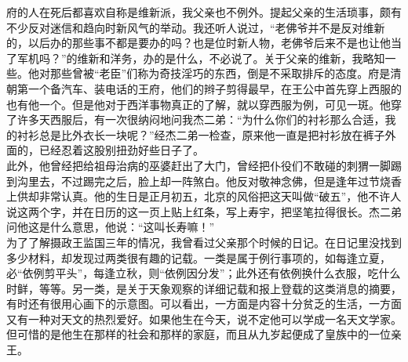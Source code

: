 府的人在死后都喜欢自称是维新派，我父亲也不例外。提起父亲的生活琐事，颇有不少反对迷信和趋向时新风气的举动。我还听人说过，“老佛爷并不是反对维新的，以后办的那些事不都是要办的吗？也是位时新人物，老佛爷后来不是也让他当了军机吗？”的维新和洋务，办的是什么，不必说了。关于父亲的维新，我略知一些。他对那些曾被“老臣”们称为奇技淫巧的东西，倒是不采取排斥的态度。府是清朝第一个备汽车、装电话的王府，他们的辫子剪得最早，在王公中首先穿上西服的也有他一个。但是他对于西洋事物真正的了解，就以穿西服为例，可见一斑。他穿了许多天西服后，有一次很纳闷地问我杰二弟：“为什么你们的衬衫那么合适，我的衬衫总是比外衣长一块呢？”经杰二弟一检查，原来他一直是把衬衫放在裤子外面的，已经忍着这股别扭劲好些日子了。\\

此外，他曾经把给祖母治病的巫婆赶出了大门，曾经把仆役们不敢碰的刺猬一脚踢到沟里去，不过踢完之后，脸上却一阵煞白。他反对敬神念佛，但是逢年过节烧香上供却非常认真。他的生日是正月初五，北京的风俗把这天叫做“破五”，他不许人说这两个字，并在日历的这一页上贴上红条，写上寿宇，把坚笔拉得很长。杰二弟问他这是什么意思，他说：“这叫长寿嘛！”\\

为了了解摄政王监国三年的情况，我曾看过父亲那个时候的日记。在日记里没找到多少材料，却发现过两类很有趣的记载。一类是属于例行事项的，如每逢立夏，必“依例剪平头”，每逢立秋，则“依例因分发”；此外还有依例换什么衣服，吃什么时鲜，等等。另一类，是关于天象观察的详细记载和报上登载的这类消息的摘要，有时还有很用心画下的示意图。可以看出，一方面是内容十分贫乏的生活，一方面又有一种对天文的热烈爱好。如果他生在今天，说不定他可以学成一名天文学家。但可惜的是他生在那样的社会和那样的家庭，而且从九岁起便成了皇族中的一位亲王。
